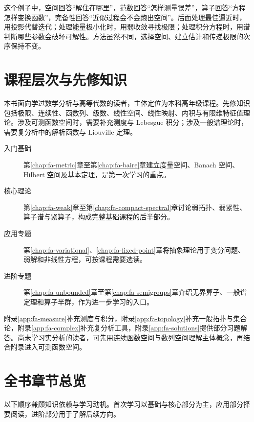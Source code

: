 这个例子中，空间回答“解住在哪里”，范数回答“怎样测量误差”，算子回答“方程怎样变换函数”，完备性回答“近似过程会不会跑出空间”。后面处理最佳逼近时，用投影代替迭代；处理能量极小化时，用弱收敛寻找极限；处理积分方程时，用谱判断哪些参数会破坏可解性。方法虽然不同，选择空间、建立估计和传递极限的次序保持不变。

\section{课程层次与先修知识}

本书面向学过数学分析与高等代数的读者，主体定位为本科高年级课程。先修知识包括极限、连续性、函数列、级数、线性空间、线性映射、内积与有限维特征值理论。涉及可测函数空间时，需要补充测度与 Lebesgue 积分；涉及一般谱理论时，需要复分析中的解析函数与 Liouville 定理。

\begin{description}
  \item[入门基础] 第\ref{chap:fa-metric}章至第\ref{chap:fa-baire}章建立度量空间、Banach 空间、Hilbert 空间及基本定理，是第一次学习的重点。
  \item[核心理论] 第\ref{chap:fa-weak}章至第\ref{chap:fa-compact-spectral}章讨论弱拓扑、弱紧性、算子谱与紧算子，构成完整基础课程的后半部分。
  \item[应用专题] 第\ref{chap:fa-variational}、\ref{chap:fa-fixed-point}章将抽象理论用于变分问题、弱解和非线性方程，可按课程需要选读。
  \item[进阶专题] 第\ref{chap:fa-unbounded}章至第\ref{chap:fa-semigroups}章介绍无界算子、一般谱定理和算子半群，作为进一步学习的入口。
\end{description}

附录\ref{app:fa-measure}补充测度与积分，附录\ref{app:fa-topology}补充一般拓扑与集合论，附录\ref{app:fa-complex}补充复分析工具，附录\ref{app:fa-solutions}提供部分习题解答。尚未学习实分析的读者，可先用连续函数空间与数列空间理解主体概念，再结合附录进入可测函数空间。

\section{全书章节总览}

以下顺序兼顾知识依赖与学习动机。首次学习以基础与核心部分为主，应用部分择要阅读，进阶部分用于了解后续方向。

